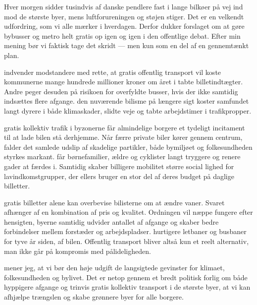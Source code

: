 Hver morgen sidder tusindvis af danske pendlere fast i lange bilkøer på vej ind mod de største byer, mens luftforureningen og støjen stiger. Det er  en velkendt udfordring, som vi alle mærker i hverdagen. Derfor dukker forslaget om at gøre bybusser og metro helt gratis op igen og igen i den offentlige debat. Efter min mening bør vi faktisk tage det skridt --- men kun som en del af en gennemtænkt plan.

 indvender modstandere med rette, at gratis offentlig transport vil koste kommunerne mange hundrede millioner kroner om året i tabte billetindtægter. Andre peger desuden på risikoen for overfyldte busser, hvis der ikke samtidig indsættes flere afgange.   den nuværende bilisme på længere sigt koster samfundet langt dyrere i både klimaskader, slidte veje og tabte arbejdstimer i trafikpropper.

 gratis kollektiv trafik i byzonerne får almindelige borgere et tydeligt incitament til at lade bilen stå derhjemme. Når færre private biler kører gennem centrum, falder det samlede udslip af skadelige partikler,  både bymiljøet og folkesundheden styrkes markant.  får børnefamilier, ældre og cyklister langt tryggere og renere gader at færdes i. Samtidig skaber billigere mobilitet større social lighed for lavindkomstgrupper, der ellers bruger en stor del af deres budget på daglige billetter.

 gratis billetter alene kan overbevise bilisterne om at ændre vaner. Svaret afhænger af en kombination af pris og kvalitet. Ordningen vil næppe fungere efter hensigten,  byerne samtidig udvider antallet af afgange og skaber bedre forbindelser mellem forstæder og arbejdspladser.  hurtigere letbaner og busbaner for tyve år siden,  af bilen. Offentlig transport bliver altså kun et reelt alternativ,  man ikke går på kompromis med pålideligheden.

 mener jeg, at vi bør  den høje udgift  de langsigtede gevinster for klimaet, folkesundheden og bylivet. Det er netop gennem et bredt politisk forlig om både hyppigere afgange og trinvis gratis kollektiv transport i de største byer, at vi kan afhjælpe trængslen og skabe grønnere byer for alle borgere.


